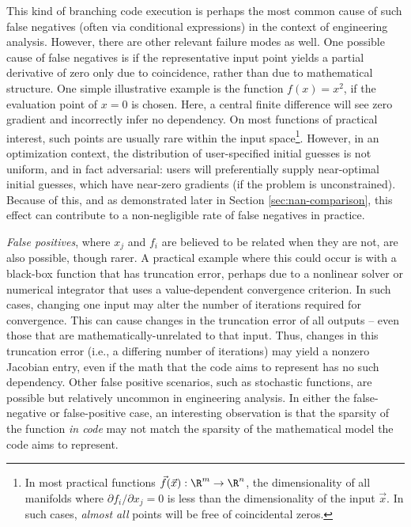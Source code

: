 \documentclass{article}
\begin{document}
This kind of branching code execution is perhaps the most common cause of such false negatives (often via conditional expressions) in the context of engineering analysis. However, there are other relevant failure modes as well. One possible cause of false negatives is if the representative input point yields a partial derivative of zero only due to coincidence, rather than due to mathematical structure. One simple illustrative example is the function $f(x) = x^2$, if the evaluation point of $x = 0$ is chosen. Here, a central finite difference will see zero gradient and incorrectly infer no dependency. On most functions of practical interest, such points are usually rare within the input space\footnote{In most practical functions $\vec{f}(\vec{x}): \R^m \rightarrow \R^n$, the dimensionality of all manifolds where $\partial f_i/\partial x_j=0$ is less than the dimensionality of the input $\vec{x}$. In such cases, \emph{almost all} points will be free of coincidental zeros.}. However, in an optimization context, the distribution of user-specified initial guesses is not uniform, and in fact adversarial: users will preferentially supply near-optimal initial guesses, which have near-zero gradients (if the problem is unconstrained). Because of this, and as demonstrated later in Section \ref{sec:nan-comparison}, this effect can contribute to a non-negligible rate of false negatives in practice.

\emph{False positives}, where $x_j$ and $f_i$ are believed to be related when they are not, are also possible, though rarer. A practical example where this could occur is with a black-box function that has truncation error, perhaps due to a nonlinear solver or numerical integrator that uses a value-dependent convergence criterion. In such cases, changing one input may alter the number of iterations required for convergence. This can cause changes in the truncation error of all outputs -- even those that are mathematically-unrelated to that input. Thus, changes in this truncation error (i.e., a differing number of iterations) may yield a nonzero Jacobian entry, even if the math that the code aims to represent has no such dependency. Other false positive scenarios, such as stochastic functions, are possible but relatively uncommon in engineering analysis. In either the false-negative or false-positive case, an interesting observation is that the sparsity of the function \emph{in code} may not match the sparsity of the mathematical model the code aims to represent.
\end{document}
